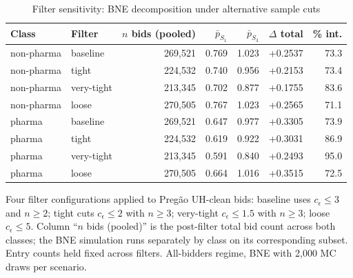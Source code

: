 \begin{table}[htbp]
\centering
\begin{threeparttable}
\caption{Filter sensitivity: BNE decomposition under alternative sample cuts}
\label{tab:v3_filter_sensitivity}
\small
\begin{tabular}{llrrrrr}
\toprule
Class & Filter & $n$ bids (pooled) & $\bar p_{S_1}$ & $\bar p_{S_3}$ & $\Delta$ total & \% int. \\
\midrule
non-pharma & baseline & 269,521 & 0.769 & 1.023 & +0.2537 & 73.3 \\
non-pharma & tight & 224,532 & 0.740 & 0.956 & +0.2153 & 73.4 \\
non-pharma & very-tight & 213,345 & 0.702 & 0.877 & +0.1755 & 83.6 \\
non-pharma & loose & 270,505 & 0.767 & 1.023 & +0.2565 & 71.1 \\
pharma & baseline & 269,521 & 0.647 & 0.977 & +0.3305 & 73.9 \\
pharma & tight & 224,532 & 0.619 & 0.922 & +0.3031 & 86.9 \\
pharma & very-tight & 213,345 & 0.591 & 0.840 & +0.2493 & 95.0 \\
pharma & loose & 270,505 & 0.664 & 1.016 & +0.3515 & 72.5 \\
\bottomrule
\end{tabular}
\begin{tablenotes}\footnotesize
\item Four filter configurations applied to Preg\~ao UH-clean
bids: baseline uses $c_\epsilon \le 3$ and $n \ge 2$;
tight cuts $c_\epsilon \le 2$ with $n \ge 3$; very-tight
$c_\epsilon \le 1.5$ with $n \ge 3$; loose $c_\epsilon \le 5$.
Column ``$n$ bids (pooled)'' is the post-filter total bid count
across both classes; the BNE simulation runs separately by class
on its corresponding subset. Entry counts held fixed across
filters. All-bidders regime, BNE with 2{,}000 MC draws per
scenario.
\end{tablenotes}
\end{threeparttable}
\end{table}
